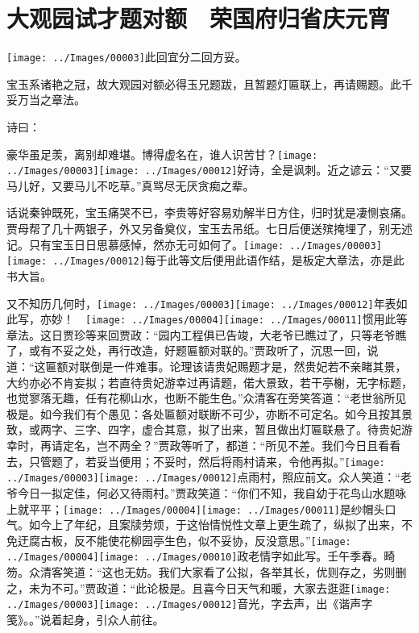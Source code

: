 
\chapter{大观园试才题对额　荣国府归省庆元宵}

{\texttt{[image: ../Images/00003]}\kaishu 此回宜分二回方妥。}

{\kaishu 宝玉系诸艳之冠，故大观园对额必得玉兄题跋，且暂题灯匾联上，再请赐题。此千妥万当之章法。}

诗曰：

豪华虽足羡，离别却难堪。博得虚名在，谁人识苦甘？{\texttt{[image: ../Images/00003]}\texttt{[image: ../Images/00012]}\footnotesize \kaishu 好诗，全是讽刺。近之谚云：``又要马儿好，又要马儿不吃草。''真骂尽无厌贪痴之辈。}

话说秦钟既死，宝玉痛哭不已，李贵等好容易劝解半日方住，归时犹是凄恻哀痛。贾母帮了几十两银子，外又另备奠仪，宝玉去吊纸。七日后便送殡掩埋了，别无述记。只有宝玉日日思慕感悼，然亦无可如何了。{\texttt{[image: ../Images/00003]}\texttt{[image: ../Images/00012]}\footnotesize \kaishu 每于此等文后便用此语作结，是板定大章法，亦是此书大旨。}

又不知历几何时，{\texttt{[image: ../Images/00003]}\texttt{[image: ../Images/00012]}\footnotesize \kaishu 年表如此写，亦妙！　{\texttt{[image: ../Images/00004]}\texttt{[image: ../Images/00011]}\footnotesize \kaishu 惯用此等章法。}}这日贾珍等来回贾政：``园内工程俱已告竣，大老爷已瞧过了，只等老爷瞧了，或有不妥之处，再行改造，好题匾额对联的。''贾政听了，沉思一回，说道：``这匾额对联倒是一件难事。论理该请贵妃赐题才是，然贵妃若不亲睹其景，大约亦必不肯妄拟；若直待贵妃游幸过再请题，偌大景致，若干亭榭，无字标题，也觉寥落无趣，任有花柳山水，也断不能生色。''众清客在旁笑答道：``老世翁所见极是。如今我们有个愚见：各处匾额对联断不可少，亦断不可定名。如今且按其景致，或两字、三字、四字，虚合其意，拟了出来，暂且做出灯匾联悬了。待贵妃游幸时，再请定名，岂不两全？''贾政等听了，都道：``所见不差。我们今日且看看去，只管题了，若妥当便用；不妥时，然后将雨村请来，令他再拟。''{\texttt{[image: ../Images/00003]}\texttt{[image: ../Images/00012]}\footnotesize \kaishu 点雨村，照应前文。}众人笑道：``老爷今日一拟定佳，何必又待雨村。''贾政笑道：``你们不知，我自幼于花鸟山水题咏上就平平；{\texttt{[image: ../Images/00004]}\texttt{[image: ../Images/00011]}\footnotesize \kaishu 是纱帽头口气。}如今上了年纪，且案牍劳烦，于这怡情悦性文章上更生疏了，纵拟了出来，不免迂腐古板，反不能使花柳园亭生色，似不妥协，反没意思。''{\texttt{[image: ../Images/00004]}\texttt{[image: ../Images/00010]}\footnotesize \kaishu 政老情字如此写。壬午季春。畸笏。}众清客笑道：``这也无妨。我们大家看了公拟，各举其长，优则存之，劣则删之，未为不可。''贾政道：``此论极是。且喜今日天气和暖，大家去逛逛{\texttt{[image: ../Images/00003]}\texttt{[image: ../Images/00012]}\footnotesize \kaishu 音光，字去声，出《谐声字笺》。}。''说着起身，引众人前往。

